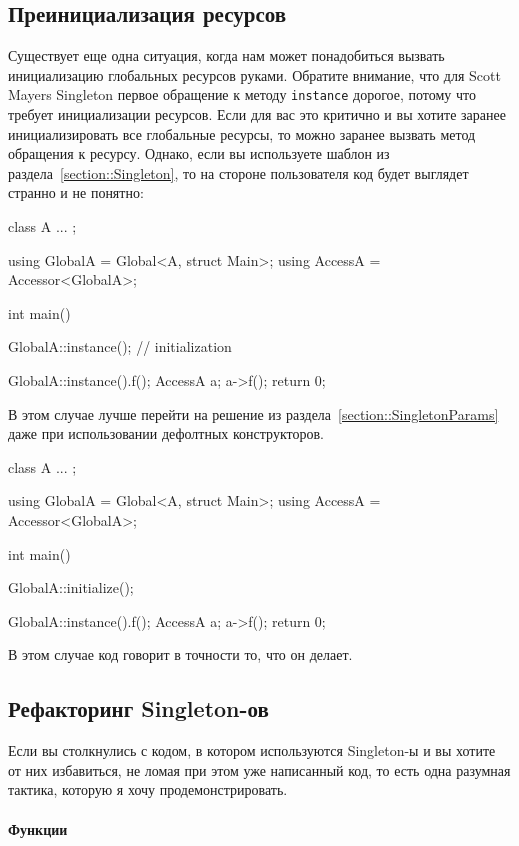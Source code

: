 \subsection{Преинициализация ресурсов}

Существует еще одна ситуация, когда нам может понадобиться вызвать инициализацию глобальных ресурсов руками.
Обратите внимание, что для Scott Mayers Singleton первое обращение к методу \verb"instance" дорогое, потому что требует инициализации ресурсов.
Если для вас это критично и вы хотите заранее инициализировать все глобальные ресурсы, то можно заранее вызвать метод обращения к ресурсу. 
Однако, если вы используете шаблон из раздела~\ref{section::Singleton}, то на стороне пользователя код будет выглядет странно и не понятно:
\begin{cppcode}
class A { ... };

using GlobalA = Global<A, struct Main>;
using AccessA = Accessor<GlobalA>;

int main() {
  GlobalA::instance(); // initialization
  
  GlobalA::instance().f();
  AccessA a;
  a->f();
  return 0;
}
\end{cppcode}
В этом случае лучше перейти на решение из раздела~\ref{section::SingletonParams} даже при использовании дефолтных конструкторов.
\begin{cppcode}
class A { ... };

using GlobalA = Global<A, struct Main>;
using AccessA = Accessor<GlobalA>;

int main() {
  GlobalA::initialize();
  
  GlobalA::instance().f();
  AccessA a;
  a->f();
  return 0;
}
\end{cppcode}
В этом случае код говорит в точности то, что он делает.

\subsection{Рефакторинг Singleton-ов}
\label{section::SingletonRefactoring}

Если вы столкнулись с кодом, в котором используются Singleton-ы и вы хотите от них избавиться, не ломая при этом уже написанный код, то есть одна разумная тактика, которую я хочу продемонстрировать.

\paragraph{Функции}

